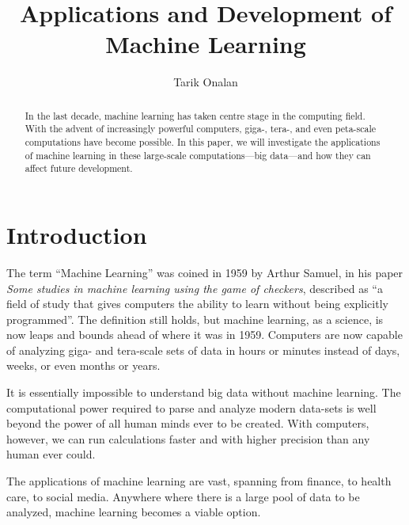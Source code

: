 \documentclass{comjnl}
\numberwithin{equation}{subsection}
\begin{document}
    \title{Applications and Development of Machine Learning}
    \author{Tarik Onalan}


    \begin{abstract}

        In the last decade, machine learning has taken centre stage in the computing field. With the
        advent of increasingly powerful computers, giga-, tera-, and even peta-scale computations have
        become possible. In this paper, we will investigate the applications of machine learning in
        these large-scale computations---big data---and how they can affect future development.

    \end{abstract}

    \maketitle



    \section{Introduction}
        
        The term ``Machine Learning'' was coined in 1959 by Arthur Samuel, in his paper \textit{Some
        studies in machine learning using the game of checkers}, described as ``a field
        of study that gives computers the ability to learn without being explicitly programmed''. The
        definition still holds, but machine learning, as a science, is now leaps and bounds ahead of
        where it was in 1959. Computers are now capable of analyzing giga- and tera-scale sets of data
        in hours or minutes instead of days, weeks, or even months or years.

        It is essentially impossible to understand big data without machine learning. The computational
        power required to parse and analyze modern data-sets is well beyond the power of all human minds
        ever to be created. With computers, however, we can run calculations faster and with higher
        precision than any human ever could.

        The applications of machine learning are vast, spanning from finance, to health care, to social
        media. Anywhere where there is a large pool of data to be analyzed, machine learning becomes a
        viable option.
\end{document}
